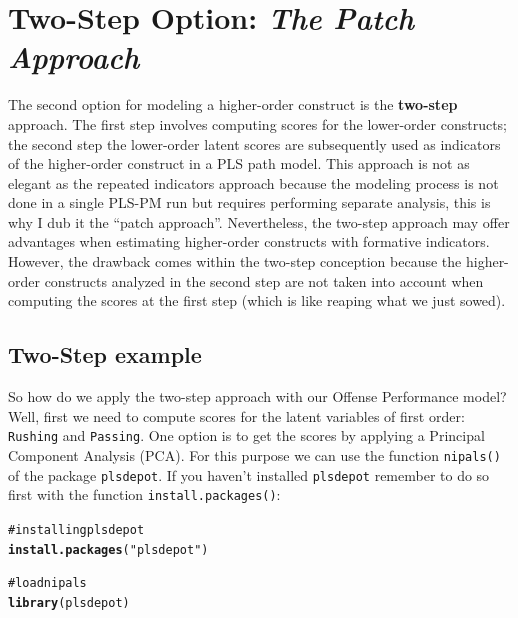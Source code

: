 \documentclass[12pt]{book}\usepackage{graphicx, color}
\makeatletter
\newcommand{\hlfunctioncall}[1]{\textcolor[rgb]{0.501960784313725,0,0.329411764705882}{\textbf{#1}}}%
\newcommand{\hlstring}[1]{\textcolor[rgb]{0.6,0.6,1}{#1}}%
\newcommand{\hlcomment}[1]{\textcolor[rgb]{0.180392156862745,0.6,0.341176470588235}{#1}}%
\newenvironment{kframe}{%
 \def\at@end@of@kframe{}%
 \ifinner\ifhmode%
  \def\at@end@of@kframe{\end{minipage}}%
  \begin{minipage}{\columnwidth}%
 \fi\fi%
 \def\FrameCommand##1{\hskip\@totalleftmargin \hskip-\fboxsep
 \colorbox{shadecolor}{##1}\hskip-\fboxsep
     \hskip-\linewidth \hskip-\@totalleftmargin \hskip\columnwidth}%
 \MakeFramed {\advance\hsize-\width
   \@totalleftmargin\z@ \linewidth\hsize
   \@setminipage}}%
 {\par\unskip\endMakeFramed%
 \at@end@of@kframe}
\newenvironment{knitrout}{}{} %
\newcommand{\code}[1]{\texttt{#1}}
\makeatother
\begin{document}
\section{Two-Step Option: \textit{The Patch Approach}}
The second option for modeling a higher-order construct is the \textbf{two-step} approach. The first step involves computing scores for the lower-order constructs; the second step the lower-order latent scores are subsequently used as indicators of the higher-order construct in a PLS path model. This approach is not as elegant as the repeated indicators approach because the modeling process is not done in a single PLS-PM run but requires performing separate analysis, this is why I dub it the ``patch approach''. Nevertheless, the two-step approach may offer advantages when estimating higher-order constructs with formative indicators. However, the drawback comes within the two-step conception because the higher-order constructs analyzed in the second step are not taken into account when computing the scores at the first step (which is like reaping what we just sowed).

\subsection{Two-Step example}
So how do we apply the two-step approach with our Offense Performance model? Well, first we need to compute scores for the latent variables of first order: \code{Rushing} and \code{Passing}. One option is to get the scores by applying a Principal Component Analysis (PCA). For this purpose we can use the function \code{nipals()} of the package \code{plsdepot}. If you haven't installed \code{plsdepot} remember to do so first with the function \code{install.packages()}:
\begin{knitrout}
\color{fgcolor}\begin{kframe}
\begin{alltt}
\hlcomment{# installing plsdepot}
\hlfunctioncall{install.packages}(\hlstring{"plsdepot"})

\hlcomment{# load nipals}
\hlfunctioncall{library}(plsdepot)
\end{alltt}
\end{kframe}
\end{knitrout}
\end{document}
